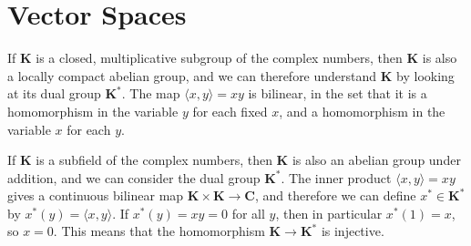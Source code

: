 \chapter{Vector Spaces}

If $\mathbf{K}$ is a closed, multiplicative subgroup of the complex numbers, then $\mathbf{K}$ is also a locally compact abelian group, and we can therefore understand $\mathbf{K}$ by looking at its dual group $\mathbf{K}^*$. The map $\langle x,y \rangle = xy$ is bilinear, in the set that it is a homomorphism in the variable $y$ for each fixed $x$, and a homomorphism in the variable $x$ for each $y$.

If $\mathbf{K}$ is a subfield of the complex numbers, then $\mathbf{K}$ is also an abelian group under addition, and we can consider the dual group $\mathbf{K}^*$. The inner product $\langle x, y \rangle = xy$ gives a continuous bilinear map $\mathbf{K} \times \mathbf{K} \to \mathbf{C}$, and therefore we can define $x^* \in \mathbf{K}^*$ by $x^*(y) = \langle x,y \rangle$. If $x^*(y) = xy = 0$ for all $y$, then in particular $x^*(1) = x$, so $x = 0$. This means that the homomorphism $\mathbf{K} \to \mathbf{K}^*$ is injective.


